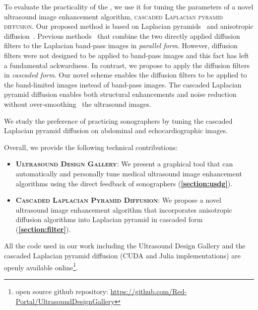 To evaluate the practicality of the \usdg, we use it for tuning the parameters of a novel ultrasound image enhancement algorithm, \textsc{cascaded Laplacian pyramid diffusion}.
Our proposed method is based on Laplacian pyramids~\cite{burt_laplacian_1983} and anisotropic diffusion~\cite{perona_scalespace_1990, weickert_anisotropic_1998}.
Previous methods~\cite{zhang_multiscale_2006, zhang_nonlinear_2007, kang_new_2016} that combine the two directly applied diffusion filters to the Laplacian band-pass images in \textit{parallel form}.
However, diffusion filters were not designed to be applied to band-pass images and this fact has left a fundamental ackwardness.
In contrast, we propose to apply the diffusion filters in \textit{cascaded form}.
Our novel scheme enables the diffusion filters to be applied to the band-limited images instead of band-pass images.
The cascaded Laplacian pyramid diffusion enables both structural enhancements and noise reduction without over-smoothing~\cite{ramos-llorden_anisotropic_2015, mishra_edge_2018} the ultrasound images.

We study the preference of practicing sonographers by tuning the cascaded Laplacian pyramid diffusion on abdominal and echocardiographic images.

Overall, we provide the following technical contributions:
\begin{itemize}
  \item[\ding{228}] \textsc{\textbf{Ultrasound Design Gallery}}: We present a graphical tool that can automatically and personally tune medical ultrasound image enhancement algorithms using the direct feedback of sonographers (\textbf{\cref{section:usdg}}).
    \vspace{0.02in}
  \item[\ding{228}] \textsc{\textbf{Cascaded Laplacian Pyramid Diffusion}}:  We propose a novel ultrasound image enhancement algorithm that incorporates anisotropic diffusion algorithms into Laplacian pyramid in cascaded form (\textbf{\cref{section:filter}}).
\end{itemize}
All the code used in our work including the Ultrasound Design Gallery and the cascaded Laplacian pyramid diffusion (CUDA and Julia implementations) are openly available online\footnote{open source github repository: \url{https://github.com/Red-Portal/UltrasoundDesignGallery}}.


